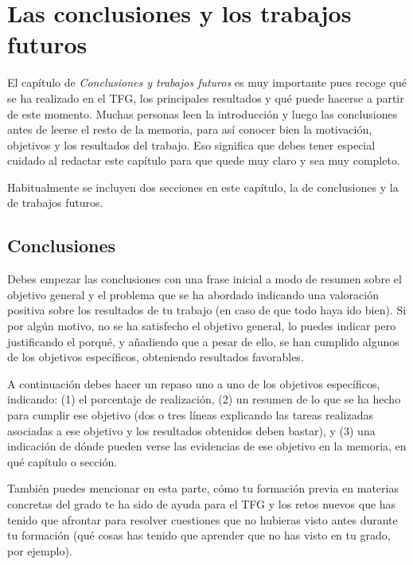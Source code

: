 \chapter{Las conclusiones y los trabajos futuros}
\label{cap:Conclusiones}

El capítulo de \textit{Conclusiones y trabajos futuros} es muy importante pues recoge qué se ha realizado en el TFG, los principales resultados y qué puede hacerse a partir de este momento. Muchas personas leen la introducción y luego las conclusiones antes de leerse el resto de la memoria, para así conocer bien la motivación, objetivos y los resultados del trabajo. Eso significa que debes tener especial cuidado al redactar este capítulo para que quede muy claro y sea muy completo.

Habitualmente se incluyen dos secciones en este capítulo, la de conclusiones y la de trabajos futuros.
 
 \section{Conclusiones}

Debes empezar las conclusiones con una frase inicial a modo de resumen sobre el objetivo general y el problema que se ha abordado indicando una valoración positiva sobre los resultados de tu trabajo (en caso de que todo haya ido bien). Si por algún motivo, no se ha satisfecho el objetivo general, lo puedes indicar pero justificando el porqué, y añadiendo que a pesar de ello, se han cumplido algunos de los objetivos específicos, obteniendo resultados favorables. 

A continuación debes hacer un repaso uno a uno de los objetivos específicos, indicando: (1) el porcentaje de realización, (2) un resumen de lo que se ha hecho para cumplir ese objetivo (dos o tres líneas explicando las tareas realizadas asociadas a ese objetivo y los resultados obtenidos deben bastar), y (3) una indicación de dónde pueden verse las evidencias de ese objetivo en la memoria, en qué capítulo o sección.

También puedes mencionar en esta parte, cómo tu formación previa en materias concretas del grado te ha sido de ayuda para el TFG y los retos nuevos que has tenido que afrontar para resolver cuestiones que no hubieras visto antes durante tu formación (qué cosas has tenido que aprender que no has visto en tu grado, por ejemplo).

